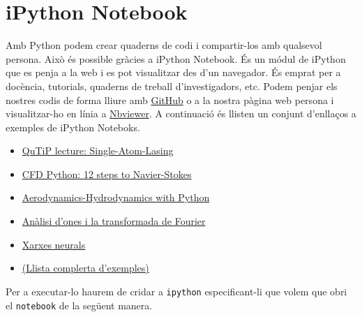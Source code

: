 \chapter{iPython Notebook}

Amb Python podem crear quaderns de codi i compartir-los amb qualsevol persona. Això és possible gràcies a iPython Notebook. És un módul de iPython que es penja a la web i es pot visualitzar des d'un navegador. És emprat per a docència, tutorials, quaderns de treball d'investigadors, etc. Podem penjar els nostres codis de forma lliure amb \href{http://github.com}{GitHub} o a la nostra pàgina web persona i visualitzar-ho en línia a \href{http://nbviewer.ipython.org/}{Nbviewer}. A continuació és llisten un conjunt d'enllaços a exemples de iPython Noteboks.


\begin{itemize}

\item \href{http://nbviewer.ipython.org/github/jrjohansson/qutip-lectures/blob/master/Lecture-2B-Single-Atom-Lasing.ipynb}{QuTiP lecture: Single-Atom-Lasing}

\item \href{http://lorenabarba.com/blog/cfd-python-12-steps-to-navier-stokes/}{CFD Python: 12 steps to Navier-Stokes}

\item \href{https://github.com/barbagroup/AeroPython}{Aerodynamics-Hydrodynamics with Python}

\item \href{https://github.com/calebmadrigal/FourierTalkOSCON}{Anàlisi d'ones i la transformada de Fourier}

\item \href{http://nbviewer.ipython.org/github/masinoa/machine_learning/blob/master/04_Neural_Networks.ipynb}{Xarxes neurals}

\item \href{https://github.com/ipython/ipython/wiki/A-gallery-of-interesting-IPython-Notebooks#mathematics-physics-chemistry-biology}{(Llista complerta d'exemples)}

\end{itemize}

Per a executar-lo haurem de cridar a {\tt ipython} especificant-li que volem que obri el {\tt notebook} de la següent manera.


